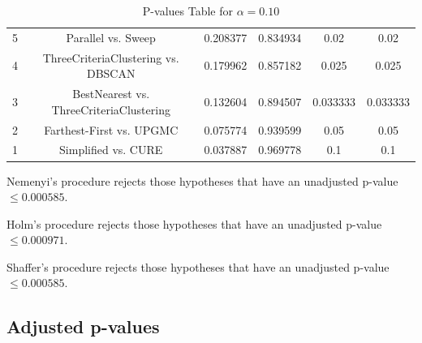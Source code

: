 \documentclass[a4paper,10pt]{article}
\begin{document}
\begin{landscape}
\begin{table}[!htp]
\begin{tabular}{cccccc}
5&Parallel vs. Sweep&0.208377&0.834934&0.02&0.02\\
4&ThreeCriteriaClustering vs. DBSCAN&0.179962&0.857182&0.025&0.025\\
3&BestNearest vs. ThreeCriteriaClustering&0.132604&0.894507&0.033333&0.033333\\
2&Farthest-First vs. UPGMC&0.075774&0.939599&0.05&0.05\\
1&Simplified vs. CURE&0.037887&0.969778&0.1&0.1\\
\hline
\end{tabular}
\caption{P-values Table for $\alpha=0.10$}
\end{table}Nemenyi's procedure rejects those hypotheses that have an unadjusted p-value $\le0.000585$.

Holm's procedure rejects those hypotheses that have an unadjusted p-value $\le0.000971$.

Shaffer's procedure rejects those hypotheses that have an unadjusted p-value $\le0.000585$.

\pagebreak

\subsection{Adjusted p-values}


\end{landscape}
\end{document}

